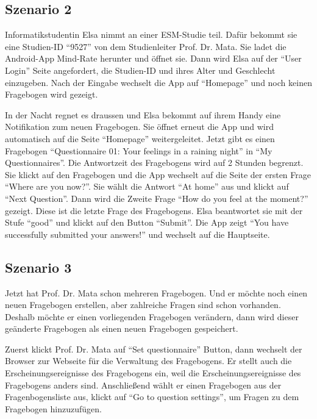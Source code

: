 \documentclass[a4paper]{scrreprt}
\begin{document}
            \subsection{Szenario 2}
	            \par Informatikstudentin Elsa nimmt an einer ESM-Studie teil. Dafür bekommt sie eine Studien-ID ``9527'' von dem Studienleiter Prof. Dr. Mata. Sie ladet die Android-App Mind-Rate herunter und \"offnet sie. Dann wird Elsa auf der ``User Login'' Seite angefordert, die Studien-ID und ihres Alter und Geschlecht einzugeben. Nach der Eingabe wechselt die App auf ``Homepage'' und noch keinen Fragebogen wird gezeigt.
                
	            \par In der Nacht regnet es draussen und Elsa bekommt auf ihrem Handy eine Notifikation zum neuen Fragebogen. Sie \"offnet erneut die App und wird automatisch auf die Seite ``Homepage'' weitergeleitet. Jetzt gibt es einen Fragebogen ``Questionnaire 01: Your feelings in a raining night'' in ``My Questionnaires''. Die Antwortzeit des Fragebogens wird auf 2 Stunden begrenzt. Sie klickt auf den Fragebogen und die App wechselt auf die Seite der ersten Frage ``Where are you now?''. Sie w\"ahlt die Antwort ``At home'' aus und klickt auf ``Next Question''. Dann wird die Zweite Frage ``How do you feel at the moment?'' gezeigt. Diese ist die letzte Frage des Fragebogens. Elsa beantwortet sie mit der Stufe ``good'' und klickt auf den Button ``Submit''. Die App zeigt “You have successfully submitted your answers!” und wechselt auf die Hauptseite.

            \subsection{Szenario 3}
                \par Jetzt hat Prof. Dr. Mata schon mehreren Fragebogen. Und er möchte noch einen neuen Fragebogen erstellen, aber zahlreiche Fragen sind schon vorhanden. Deshalb möchte er einen vorliegenden Fragebogen verändern, dann wird dieser geänderte Fragebogen als einen neuen Fragebogen gespeichert.
                
                \par Zuerst klickt Prof. Dr. Mata auf ``Set questionnaire'' Button, dann wechselt der Browser zur Webseite für die Verwaltung des Fragebogens. Er stellt auch die \gls{Erscheinungsereignis}se des Fragebogens ein, weil die \gls{Erscheinungsereignis}se des Fragebogens anders sind. Anschließend wählt er einen Fragebogen aus der Fragenbogensliste aus, klickt auf ``Go to question settings'', um Fragen zu dem Fragebogen hinzuzufügen.
                
\end{document}
